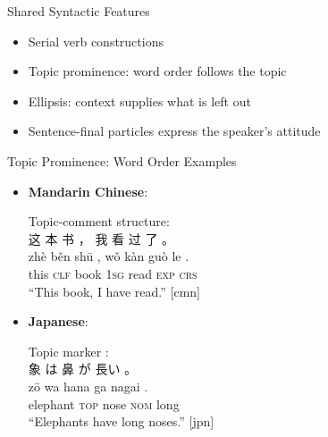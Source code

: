 \documentclass{beamer}
\begin{document}
\begin{frame}{Shared Syntactic Features}
    \begin{itemize}
        \item Serial verb constructions
        \item Topic prominence: word order follows the topic
        \item Ellipsis: context supplies what is left out
        \item Sentence-final particles express the speaker's attitude
    \end{itemize}
\end{frame}
\begin{frame}{Topic Prominence: Word Order Examples}
    \begin{itemize}
        \item \textbf{Mandarin Chinese}:
            \begin{exe}
                \ex Topic-comment structure: \\
                \glll 这 本 书 ， 我 看 过 了 。 \\
                 zhè běn shū , wǒ kàn guò le . \\
                 this \textsc{clf} book {} 1\textsc{sg} read \textsc{exp} \textsc{crs} {} \\
                \glt ``This book, I have read.'' [cmn]
            \end{exe}
        \item \textbf{Japanese}:
          \begin{exe}
            \let\eachwordone=\glossja
            \ex Topic marker  : \\
            \glll 象 は 鼻 が 長い 。 \\
            zō wa hana ga nagai . \\
            elephant \textsc{top} nose \textsc{nom} long {} \\
            \glt ``Elephants have long noses.'' [jpn]
          \end{exe}
    \end{itemize}
\end{frame}
\end{document}
